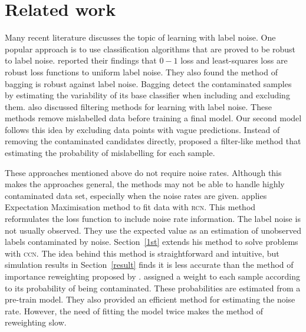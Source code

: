 \documentclass[12pt]{article} %
\begin{document}
\section{Related work}
Many recent literature discusses the topic of learning with label noise. One popular approach is to use classification algorithms that are proved to be robust to label noise. \citet{frenay2014classification} reported their findings that $0-1$ loss and least-squares loss are robust loss functions to uniform label noise. %
They also found the method of bagging is robust against label noise. Bagging detect the contaminated samples by estimating the variability of its base classifier when including and excluding them. %
\citet{frenay2014classification} also discussed filtering methods for learning with label noise. These methods remove mislabelled data before training a final model. Our second model follows this idea by excluding data points with vague predictions. Instead of removing the contaminated candidates directly, \citet{yang2018adasampling} proposed a filter-like method that estimating the probability of mislabelling for each sample. 

These approaches mentioned above do not require noise rates. Although this makes the approaches general, the methods may not be able to handle highly contaminated data set, especially when the noise rates are given. \citet{pmlr-v20-biggio11} applies Expectation Maximisation method to fit data with \textsc{rcn}. This method reformulates the loss function to include noise rate information. The label noise is not usually observed. They use the expected value as an estimation of unobserved labels contaminated by noise. Section~\ref{1st} extends his method to solve problems with \textsc{ccn}. The idea behind this method is straightforward and intuitive, but  simulation results in Section~\ref{result} finds it is less accurate than the method of importance reweighting proposed by \citet{liu2016classification}. \citet{liu2016classification} assigned a weight to each sample according to its probability of being contaminated. These probabilities are estimated from a pre-train model. They also provided an efficient method for estimating the noise rate. However, the need of fitting the model twice makes the method of reweighting slow.
\end{document}
